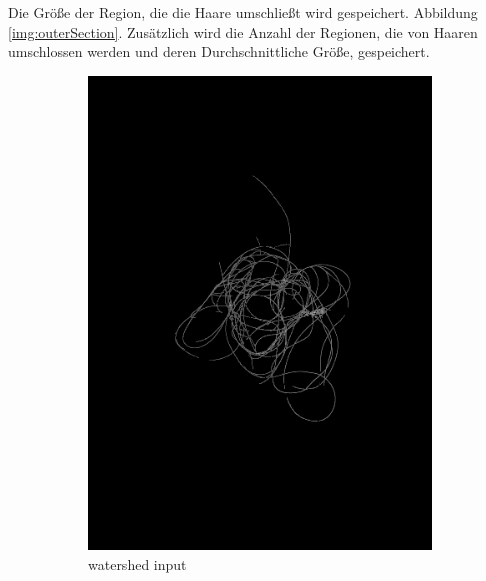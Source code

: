 \documentclass[german,a4paper, 12pt]{llncs}
\begin{document}
Die Größe der Region, die die Haare umschließt wird gespeichert. Abbildung \ref{img:outerSection}.
Zusätzlich wird die Anzahl der Regionen, die von Haaren umschlossen werden und deren Durchschnittliche Größe, gespeichert.\cite{Watershed,WatershedCV}
\begin{figure}
	\centering
	\begin{subfigure}[b]{0.475\textwidth}
		\centering
		\includegraphics[width=\textwidth]{fig64/06small regions removed.png}
		\caption[]{watershed input}
		\label{img:wsiput}
	\end{subfigure}
	\hfill
	\begin{subfigure}[b]{0.475\textwidth} 
		\centering

\end{subfigure}
\end{figure}
\end{document}

